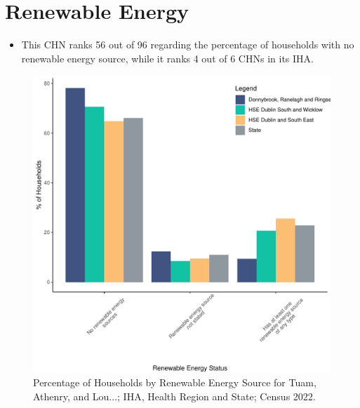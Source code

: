 \documentclass{article}
\begin{document}
\section{Renewable Energy}\label{sect:RE}
\begin{itemize}
\item This CHN ranks  56 out of 96 regarding the percentage of households with no renewable energy source, while it ranks   4 out of 6 CHNs in its IHA.
\end{itemize}
\begin{figure}[H]
	\centering
	\includegraphics[width = 140mm]{../figures/RenewableEnergyED.pdf}
	\caption{Percentage of Households by Renewable Energy Source for Tuam, Athenry, and Lou...; IHA, Health Region and State; Census 2022.}
	\label{fig:vbnv}
	\end{figure}
\end{document}
